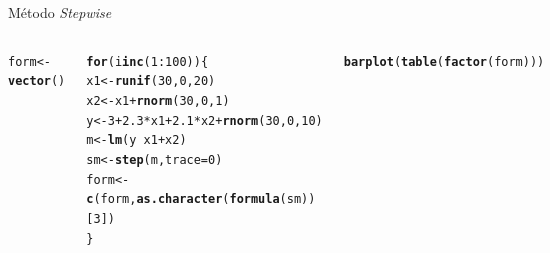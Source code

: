 \documentclass{beamer}\usepackage[]{graphicx}\usepackage[]{color}
\makeatletter
\newcommand{\hlnum}[1]{\textcolor[rgb]{0.686,0.059,0.569}{#1}}%
\newcommand{\hlopt}[1]{\textcolor[rgb]{0,0,0}{#1}}%
\newcommand{\hlstd}[1]{\textcolor[rgb]{0.345,0.345,0.345}{#1}}%
\newcommand{\hlkwa}[1]{\textcolor[rgb]{0.161,0.373,0.58}{\textbf{#1}}}%
\newcommand{\hlkwb}[1]{\textcolor[rgb]{0.69,0.353,0.396}{#1}}%
\newcommand{\hlkwc}[1]{\textcolor[rgb]{0.333,0.667,0.333}{#1}}%
\newcommand{\hlkwd}[1]{\textcolor[rgb]{0.737,0.353,0.396}{\textbf{#1}}}%
\newenvironment{kframe}{%
 \def\at@end@of@kframe{}%
 \ifinner\ifhmode%
  \def\at@end@of@kframe{\end{minipage}}%
  \begin{minipage}{\columnwidth}%
 \fi\fi%
 \def\FrameCommand##1{\hskip\@totalleftmargin \hskip-\fboxsep
 \colorbox{shadecolor}{##1}\hskip-\fboxsep
     \hskip-\linewidth \hskip-\@totalleftmargin \hskip\columnwidth}%
 \MakeFramed {\advance\hsize-\width
   \@totalleftmargin\z@ \linewidth\hsize
   \@setminipage}}%
 {\par\unskip\endMakeFramed%
 \at@end@of@kframe}
\newenvironment{knitrout}{}{} %
\renewenvironment{knitrout}{\setlength{\topsep}{0mm}}{}
\makeatother
\begin{document}
\begin{frame}[fragile]{Método \emph{Stepwise}}

\begin{columns}

\setlength{\topsep}{2pt}
\begin{knitrout}\tiny
{}\color{fgcolor}\begin{kframe}
\begin{alltt}
\hlstd{form} \hlkwb{<-} \hlkwd{vector}\hlstd{()}

\hlkwa{for}\hlstd{(i} \hlkwa{in} \hlkwd{c}\hlstd{(}\hlnum{1}\hlopt{:}\hlnum{100}\hlstd{))\{}
    \hlstd{x1} \hlkwb{<-} \hlkwd{runif}\hlstd{(}\hlnum{30}\hlstd{,}\hlnum{0}\hlstd{,}\hlnum{20}\hlstd{)}
    \hlstd{x2} \hlkwb{<-} \hlstd{x1} \hlopt{+} \hlkwd{rnorm}\hlstd{(}\hlnum{30}\hlstd{,}\hlnum{0}\hlstd{,}\hlnum{1}\hlstd{)}
    \hlstd{y} \hlkwb{<-} \hlnum{3} \hlopt{+} \hlnum{2.3}\hlopt{*}\hlstd{x1} \hlopt{+} \hlnum{2.1}\hlopt{*}\hlstd{x2} \hlopt{+} \hlkwd{rnorm}\hlstd{(}\hlnum{30}\hlstd{,}\hlnum{0}\hlstd{,}\hlnum{10}\hlstd{)}
    \hlstd{m} \hlkwb{<-} \hlkwd{lm}\hlstd{(y} \hlopt{~} \hlstd{x1} \hlopt{+} \hlstd{x2)}
    \hlstd{sm} \hlkwb{<-} \hlkwd{step}\hlstd{(m,} \hlkwc{trace}\hlstd{=}\hlnum{0}\hlstd{)}
    \hlstd{form} \hlkwb{<-} \hlkwd{c}\hlstd{(form,} \hlkwd{as.character}\hlstd{(}\hlkwd{formula}\hlstd{(sm))[}\hlnum{3}\hlstd{])}
  \hlstd{\}}

\hlkwd{barplot}\hlstd{(}\hlkwd{table}\hlstd{(}\hlkwd{factor}\hlstd{(form)))}
\end{alltt}
\end{kframe}
\end{knitrout}


\begin{knitrout}
\color{fgcolor}
\includegraphics[width=1\linewidth]{figure/stepburrop-1} 


\end{knitrout}
\end{columns}
\end{frame}
\end{document}
